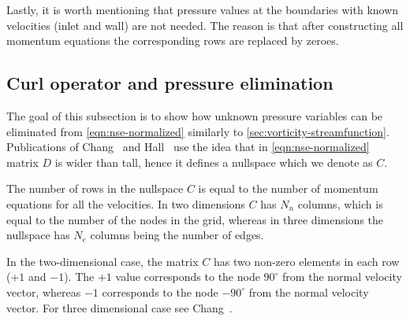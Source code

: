 \documentclass{article}
\numberwithin{equation}{section}
\begin{document}
Lastly, it is worth mentioning that pressure values at the boundaries with known velocities (inlet and wall) are not needed. The reason is that after constructing all momentum equations the corresponding rows are replaced by zeroes.



\subsection{Curl operator and pressure elimination}\label{subsec:curl}

The goal of this subsection is to show how unknown pressure variables can be eliminated from \cref{eqn:nse-normalized} similarly to \cref{sec:vorticity-streamfunction}. Publications of Chang~\cite{Chang:2002} and Hall~\cite{Hall:1980} use the idea that in \cref{eqn:nse-normalized} matrix $D$ is wider than tall, hence it defines a nullspace which we denote as $C$. 

The number of rows in the nullspace $C$ is equal to the number of momentum equations for all the velocities. In two dimensions $C$ has $N_n$ columns, which is equal to the number of the nodes in the grid, whereas in three dimensions the nullspace has $N_e$ columns being the number of edges.

In the two-dimensional case, the matrix $C$ has two non-zero elements in each row ($+1$ and $-1$). The $+1$ value corresponds to the node $90^\circ$ from the normal velocity vector, whereas $-1$ corresponds to the node $-90^\circ$ from the normal velocity vector.  For three dimensional case see Chang~\cite{Chang:2002}.
\end{document}

